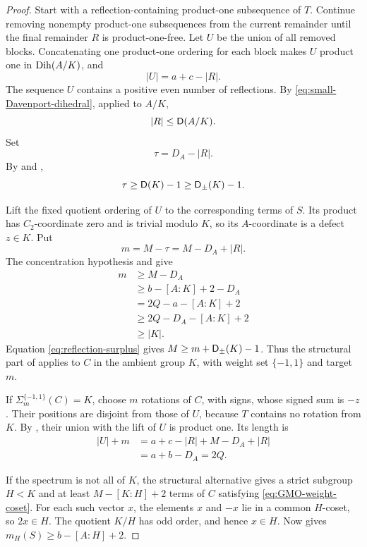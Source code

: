 \begin{proof}
Start with a reflection-containing product-one subsequence of \(T\).
Continue removing nonempty product-one subsequences from the current
remainder until the final remainder \(R\) is product-one-free. Let
\(U\) be the union of all removed blocks. Concatenating one product-one
ordering for each block makes \(U\) product one in \(\operatorname{Dih}(A/K)\), and
\[
  |U|=a+c-|R|.
\]
The sequence \(U\) contains a positive even number of reflections. By
\eqref{eq:small-Davenport-dihedral}, applied to \(A/K\),
\[
  |R|\le \mathsf D(A/K).
\]
Set
\[
  \tau=D_A-|R|.
\]
By  and
,
\begin{equation}\label{eq:reflection-surplus}
  \tau\ge \mathsf D(K)-1\ge \mathsf D_{\pm}(K)-1.
\end{equation}

Lift the fixed quotient ordering of \(U\) to the corresponding terms of
\(S\). Its product has \(C_2\)-coordinate zero and is trivial modulo
\(K\), so its \(A\)-coordinate is a defect \(z\in K\). Put
\[
  m=M-\tau=M-D_A+|R|.
\]
The concentration hypothesis and  give
\begin{align*}
  m&\ge M-D_A\\
   &\ge b-[A:K]+2-D_A\\
   &=2Q-a-[A:K]+2\\
   &\ge 2Q-D_A-[A:K]+2\\
   &\ge |K|.
\end{align*}
Equation \eqref{eq:reflection-surplus} gives
\(M\ge m+\mathsf D_{\pm}(K)-1\). Thus the structural part of
 applies to \(C\) in the ambient group \(K\), with
weight set \(\{-1,1\}\) and target \(m\).

If \(\Sigma_m^{\{-1,1\}}(C)=K\), choose \(m\) rotations of \(C\),
with signs, whose signed sum is \(-z\). Their positions are disjoint
from those of \(U\), because \(T\) contains no rotation from \(K\).
By , their union with the lift of \(U\) is
product one. Its length is
\begin{align*}
  |U|+m
  &=a+c-|R|+M-D_A+|R|\\
  &=a+b-D_A=2Q.
\end{align*}

If the spectrum is not all of \(K\), the structural alternative gives
a strict subgroup \(H<K\) and at least \(M-[K:H]+2\) terms of \(C\)
satisfying \eqref{eq:GMO-weight-coset}. For each such vector \(x\), the
elements \(x\) and \(-x\) lie in a common \(H\)-coset, so \(2x\in H\).
The quotient \(K/H\) has odd order, and hence \(x\in H\). Now
 gives
\(m_H(S)\ge b-[A:H]+2\).
\end{proof}


